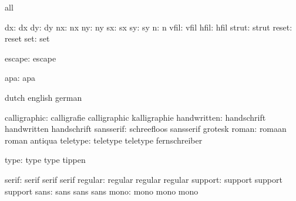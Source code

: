 \stopvariables




\startconstants       all

                 dx:  dx
                 dy:  dy
                 nx:  nx
                 ny:  ny
                 sx:  sx
                 sy:  sy
                  n:  n
               vfil:  vfil
               hfil:  hfil
              strut:  strut
              reset:  reset
                set:  set

             escape:  escape

                apa:  apa

\stopconstants




\startvariables       dutch                english             german

       calligraphic:  calligrafie          calligraphic        kalligraphie
        handwritten:  handschrift          handwritten         handschrift
          sansserif:  schreefloos          sansserif           grotesk
              roman:  romaan               roman               antiqua
           teletype:  teletype             teletype            fernschreiber

               type:  type                 type                tippen

              serif:  serif                serif               serif 
            regular:  regular              regular             regular 
            support:  support              support             support
               sans:  sans                 sans                sans  
               mono:  mono                 mono                mono

\stopvariables



